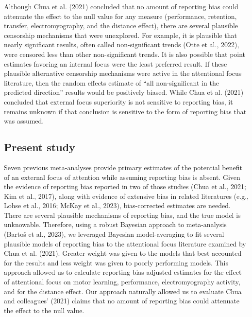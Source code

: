 \documentclass[
  11pt,
  doc, donotrepeattitle,floatsintext]{apa7}
\begin{document}
Although Chua et al. (2021) concluded that no amount of reporting bias could attenuate the effect to the null value for any measure (performance, retention, transfer, electromyography, and the distance effect), there are several plausible censorship mechanisms that were unexplored. For example, it is plausible that nearly significant results, often called non-significant trends (Otte et al., 2022), were censored less than other non-significant trends. It is also possible that point estimates favoring an internal focus were the least preferred result. If these plausible alternative censorship mechanisms were active in the attentional focus literature, then the random effects estimate of ``all non-significant in the predicted direction'' results would be positively biased. While Chua et al. (2021) concluded that external focus superiority is not sensitive to reporting bias, it remains unknown if that conclusion is sensitive to the form of reporting bias that was assumed.

\hypertarget{present-study}{%
\subsection{Present study}\label{present-study}}

Seven previous meta-analyses provide primary estimates of the potential benefit of an external focus of attention while assuming reporting bias is absent. Given the evidence of reporting bias reported in two of those studies (Chua et al., 2021; Kim et al., 2017), along with evidence of extensive bias in related literatures (e.g., Lohse et al., 2016; McKay et al., 2023), bias-corrected estimates are needed. There are several plausible mechanisms of reporting bias, and the true model is unknowable. Therefore, using a robust Bayesian approach to meta-analysis (Bartoš et al., 2023), we leveraged Bayesian model-averaging to fit several plausible models of reporting bias to the attentional focus literature examined by Chua et al. (2021). Greater weight was given to the models that best accounted for the results and less weight was given to poorly performing models. This approach allowed us to calculate reporting-bias-adjusted estimates for the effect of attentional focus on motor learning, performance, electromyography activity, and for the distance effect. Our approach naturally allowed us to evaluate Chua and colleagues' (2021) claims that no amount of reporting bias could attenuate the effect to the null value.
\end{document}
